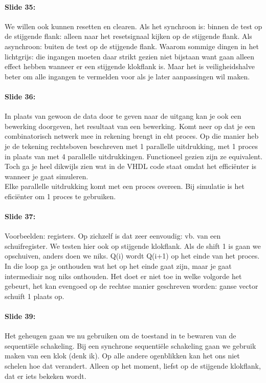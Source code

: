 \documentclass[10pt,a4paper]{book}
\begin{document}
\paragraph{Slide 35:} We willen ook kunnen resetten en clearen. Als het synchroon is: binnen de test op de stijgende flank: alleen naar het resetsignaal kijken op de stijgende flank. Als asynchroon: buiten de test op de stijgende flank. Waarom sommige dingen in het lichtgrijs: die ingangen moeten daar strikt gezien niet bijstaan want gaan alleen effect hebben wanneer er een stijgende klokflank is. Maar het is veiligheidshalve beter om alle ingangen te vermelden voor als je later aanpassingen wil maken.

\paragraph{Slide 36:} In plaats van gewoon de data door te geven naar de uitgang kan je ook een bewerking doorgeven, het resultaat van een bewerking. Komt neer op dat je een combinatorisch netwerk mee in rekening brengt in eht proces. Op die manier heb je de tekening rechtsboven beschreven met 1 parallelle uitdrukking, met 1 proces in plaats van met 4 parallelle uitdrukkingen. Functioneel gezien zijn ze equivalent. Toch ga je heel dikwijls zien wat in de VHDL code staat omdat het effici\"enter is wanneer je gaat simuleren.\\
Elke parallelle uitdrukking komt met een proces overeen. Bij simulatie is het efici\"enter om 1 proces te gebruiken.

\paragraph{Slide 37:} Voorbeelden: registers. Op zichzelf is dat zeer eenvoudig: vb. van een schuifregister. We testen hier ook op stijgende klokflank. Als de shift 1 is gaan we opschuiven, anders doen we niks. Q(i) wordt Q(i+1) op het einde van het proces. In die loop ga je onthouden wat het op het einde gaat zijn, maar je gaat intermediair nog niks onthouden. Het doet er niet toe in welke volgorde het gebeurt, het kan evengoed op de rechtse manier geschreven worden: ganse vector schuift 1 plaats op.

\paragraph{Slide 39:} Het geheugen gaan we nu gebruiken om de toestand in te bewaren van de sequenti\"ele schakeling. Bij een synchrone sequenti\"ele schakeling gaan we gebruik maken van een klok (denk ik). Op alle andere ogenblikken kan het ons niet schelen hoe dat verandert. Alleen op het moment, liefst op de stijgende klokflank, dat er iets bekeken wordt.
\end{document}
